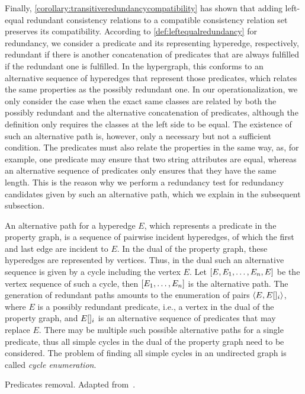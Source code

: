 Finally, \autoref{corollary:transitiveredundancycompatibility} has shown that adding left-equal redundant consistency relations to a compatible consistency relation set preserves its compatibility.
According to \autoref{def:leftequalredundancy} for redundancy, we consider a predicate and its representing hyperedge, respectively, redundant if there is another concatenation of predicates that are always fulfilled if the redundant one is fulfilled.
In the hypergraph, this conforms to an alternative sequence of hyperedges that represent those predicates, which relates the same properties as the possibly redundant one.
In our operationalization, we only consider the case when the exact same classes are related by both the possibly redundant and the alternative concatenation of predicates, although the definition only requires the classes at the left side to be equal.
The existence of such an alternative path is, however, only a necessary but not a sufficient condition.
The predicates must also relate the properties in the same way, as, for example, one predicate may ensure that two string attributes are equal, whereas an alternative sequence of predicates only ensures that they have the same length.
This is the reason why we perform a redundancy test for redundancy candidates given by such an alternative path, which we explain in the subsequent subsection.

An alternative path for a hyperedge $E$, which represents a predicate in the property graph, is a sequence of pairwise incident hyperedges, of which the first and last edge are incident to $E$.
In the dual of the property graph, these hyperedges are represented by vertices.
Thus, in the dual such an alternative sequence is given by a cycle including the vertex $E$.
Let $[E, E_1, \dots, E_n, E]$ be the vertex sequence of such a cycle, then $[E_1, \dots, E_n]$ is the alternative path.
The generation of redundant paths amounts to the enumeration of pairs $\langle E, E[]_i \rangle$, where $E$ is a possibly redundant predicate, i.e., a vertex in the dual of the property graph, and $E[]_i$ is an alternative sequence of predicates that may replace $E$.
There may be multiple such possible alternative paths for a single predicate, thus all simple cycles in the dual of the property graph need to be considered.
The problem of finding all simple cycles in an undirected graph is called \emph{cycle enumeration}.

\begin{algorithm}
    
    \caption[Removal of redundant predicates]{Predicates removal. Adapted from~.}
    \label{algo:compatibility:cycle_enumeration}
\end{algorithm}


